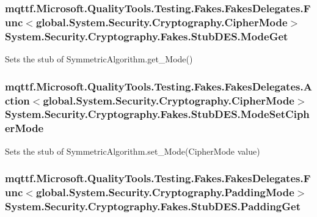 \hypertarget{class_system_1_1_security_1_1_cryptography_1_1_fakes_1_1_stub_d_e_s_a345c016f50b5adbd57517b4e744591c3}{
\subsubsection[{Mode\-Get}]{\setlength{\rightskip}{0pt plus 5cm}mqttf.\-Microsoft.\-Quality\-Tools.\-Testing.\-Fakes.\-Fakes\-Delegates.\-Func$<$global.\-System.\-Security.\-Cryptography.\-Cipher\-Mode$>$ System.\-Security.\-Cryptography.\-Fakes.\-Stub\-D\-E\-S.\-Mode\-Get}}\label{class_system_1_1_security_1_1_cryptography_1_1_fakes_1_1_stub_d_e_s_a345c016f50b5adbd57517b4e744591c3}


Sets the stub of Symmetric\-Algorithm.\-get\-\_\-\-Mode()

\hypertarget{class_system_1_1_security_1_1_cryptography_1_1_fakes_1_1_stub_d_e_s_ad8e97284a06e4c627ec012c87ba15cb2}{
\subsubsection[{Mode\-Set\-Cipher\-Mode}]{\setlength{\rightskip}{0pt plus 5cm}mqttf.\-Microsoft.\-Quality\-Tools.\-Testing.\-Fakes.\-Fakes\-Delegates.\-Action$<$global.\-System.\-Security.\-Cryptography.\-Cipher\-Mode$>$ System.\-Security.\-Cryptography.\-Fakes.\-Stub\-D\-E\-S.\-Mode\-Set\-Cipher\-Mode}}\label{class_system_1_1_security_1_1_cryptography_1_1_fakes_1_1_stub_d_e_s_ad8e97284a06e4c627ec012c87ba15cb2}


Sets the stub of Symmetric\-Algorithm.\-set\-\_\-\-Mode(\-Cipher\-Mode value)

\hypertarget{class_system_1_1_security_1_1_cryptography_1_1_fakes_1_1_stub_d_e_s_a8741ba9999f5624efe383520a8b4207d}{
\subsubsection[{Padding\-Get}]{\setlength{\rightskip}{0pt plus 5cm}mqttf.\-Microsoft.\-Quality\-Tools.\-Testing.\-Fakes.\-Fakes\-Delegates.\-Func$<$global.\-System.\-Security.\-Cryptography.\-Padding\-Mode$>$ System.\-Security.\-Cryptography.\-Fakes.\-Stub\-D\-E\-S.\-Padding\-Get}}\label{class_system_1_1_security_1_1_cryptography_1_1_fakes_1_1_stub_d_e_s_a8741ba9999f5624efe383520a8b4207d}



